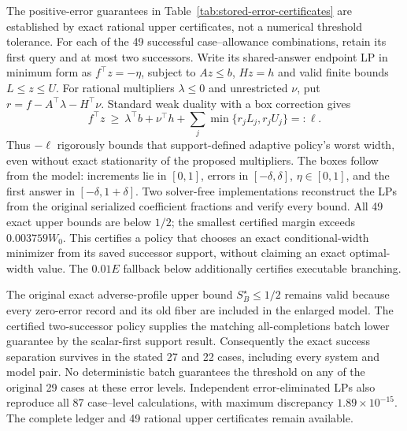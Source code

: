 The positive-error guarantees in Table~\ref{tab:stored-error-certificates}
are established by exact rational upper certificates, not a numerical
threshold tolerance. For each of the 49 successful case--allowance
combinations, retain its first query and at most two successors. Write
its shared-answer endpoint LP in minimum form as $f^\top z=-\eta$,
subject to $Az\leq b$, $Hz=h$ and valid finite bounds $L\leq z\leq U$.
For rational multipliers $\lambda\leq0$ and unrestricted $\nu$, put
$r=f-A^\top\lambda-H^\top\nu$. Standard weak duality with a box correction gives
\[
 f^\top z\ \geq\ \lambda^\top b+\nu^\top h+
       \sum_j\min\{r_jL_j,r_jU_j\}=:\ell.
\]
Thus $-\ell$ rigorously bounds that support-defined adaptive policy's
worst width, even without exact stationarity of the proposed multipliers.
The boxes follow from the model: increments lie in $[0,1]$, errors in
$[-\delta,\delta]$, $\eta\in[0,1]$, and the first answer in
$[-\delta,1+\delta]$. Two solver-free implementations reconstruct the LPs
from the original serialized coefficient fractions and verify every bound.
All 49 exact upper bounds are below $1/2$; the smallest certified margin
exceeds $0.003759W_0$. This certifies a policy that chooses an exact
conditional-width minimizer from its saved successor support, without
claiming an exact optimal-width value. The $0.01E$ fallback below additionally
certifies executable branching.

The original exact adverse-profile upper bound $S_B^\star\leq1/2$ remains
valid because every zero-error record and its old fiber are included in
the enlarged model. The certified two-successor policy supplies the
matching all-completions batch lower guarantee by the scalar-first support
result. Consequently the exact success separation survives in the stated
27 and 22 cases, including every system and model pair. No deterministic
batch guarantees the threshold on any of the original 29 cases at these
error levels. Independent error-eliminated LPs also reproduce all 87
case--level calculations, with maximum discrepancy $1.89\times10^{-15}$.
The complete ledger and 49 rational upper certificates remain available.

